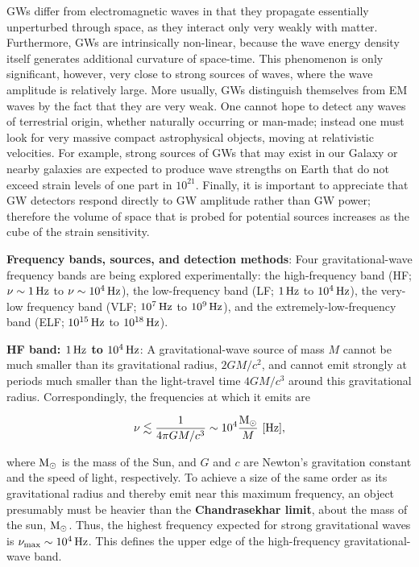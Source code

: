 \documentclass[a4paper,10pt]{article}
\begin{document}
{\noindent}GWs differ from electromagnetic waves in that they propagate essentially unperturbed through space, as they interact only very weakly with matter. Furthermore, GWs are intrinsically non-linear, because the wave energy density itself generates additional curvature of space-time. This phenomenon is only significant, however, very close to strong sources of waves, where the wave amplitude is relatively large. More usually, GWs distinguish themselves from EM waves by the fact that they are very weak. One cannot hope to detect any waves of terrestrial origin, whether naturally occurring or man-made; instead one must look for very massive compact astrophysical objects, moving at relativistic velocities. For example, strong sources of GWs that may exist in our Galaxy or nearby galaxies are expected to produce wave strengths on Earth that do not exceed strain levels of one part in $10^{21}$. Finally, it is important to appreciate that GW detectors respond directly to GW amplitude rather than GW power; therefore the volume of space that is probed for potential sources increases as the cube of the strain sensitivity.

{\noindent}\textbf{Frequency bands, sources, and detection methods}: Four gravitational-wave frequency bands are being explored experimentally: the high-frequency band (HF; $\nu\sim1\,{\rm Hz}$ to $\nu\sim10^4\,{\rm Hz}$), the low-frequency band (LF; $1\,{\rm Hz}$ to $10^4\,{\rm Hz}$), the very-low frequency band (VLF; $10^7\,{\rm Hz}$ to $10^9\,{\rm Hz}$), and the extremely-low-frequency band (ELF; $10^{15}\,{\rm Hz}$ to $10^{18}\,{\rm Hz}$).

{\noindent}\textbf{HF band: $1\,{\rm Hz}$ to $10^4\,{\rm Hz}$}: A gravitational-wave source of mass $M$ cannot be much smaller than its gravitational radius, $2GM/c^2$, and cannot emit strongly at periods much smaller than the light-travel time $4GM/c^3$ around this gravitational radius. Correspondingly, the frequencies at which it emits are

\begin{align*}
    \nu \lesssim \frac{1}{4\pi GM/c^3} \sim 10^4 \frac{\rm M_\odot}{M} ~ [{\rm Hz}],
\end{align*}

{\noindent}where ${\rm M_\odot}$ is the mass of the Sun, and $G$ and $c$ are Newton's gravitation constant and the speed of light, respectively. To achieve a size of the same order as its gravitational radius and thereby emit near this maximum frequency, an object presumably must be heavier than the \textbf{Chandrasekhar limit}, about the mass of the sun, ${\rm M_\odot}$. Thus, the highest frequency expected for strong gravitational waves is $\nu_{\rm max}\sim10^4\,{\rm Hz}$. This defines the upper edge of the high-frequency gravitational-wave band. 
\end{document}
